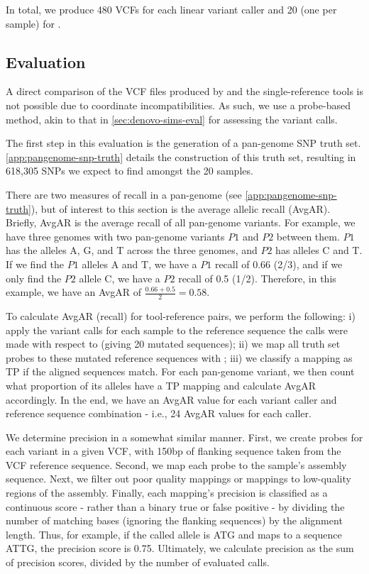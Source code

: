 \noindent
In total, we produce 480 VCFs for each linear variant caller and 20 (one per sample) for \pandora{}.

\subsection{Evaluation}
\label{sec:denovo-empirical-eval}

A direct comparison of the VCF files produced by \pandora{} and the single-reference tools is not possible due to coordinate incompatibilities. As such, we use a probe-based method, akin to that in \autoref{sec:denovo-sims-eval} for assessing the variant calls. 

The first step in this evaluation is the generation of a pan-genome SNP truth set. \autoref{app:pangenome-snp-truth} details the construction of this truth set, resulting in 618,305 SNPs we expect to find amongst the 20 samples.

There are two measures of recall in a pan-genome (see \autoref{app:pangenome-snp-truth}), but of interest to this section is the average allelic recall (AvgAR). Briefly, AvgAR is the average recall of all pan-genome variants. For example, we have three genomes with two pan-genome variants $P1$ and $P2$ between them. $P1$ has the alleles A, G, and T across the three genomes, and $P2$ has alleles C and T. If we find the $P1$ alleles A and T, we have a $P1$ recall of 0.66 (2/3), and if we only find the $P2$ allele C, we have a $P2$ recall of 0.5 (1/2). Therefore, in this example, we have an AvgAR of $\frac{0.66+0.5}{2}=0.58$.

To calculate AvgAR (recall) for tool-reference pairs, we perform the following: i) apply the variant calls for each sample to the reference sequence the calls were made with respect to (giving 20 mutated sequences); ii) we map all truth set probes to these mutated reference sequences with ; iii) we classify a mapping as TP if the aligned sequences match. For each pan-genome variant, we then count what proportion of its alleles have a TP mapping and calculate AvgAR accordingly. In the end, we have an AvgAR value for each variant caller and reference sequence combination - i.e., 24 AvgAR values for each caller.

We determine precision in a somewhat similar manner. First, we create probes for each variant in a given VCF, with 150bp of flanking sequence taken from the VCF reference sequence. Second, we map each probe to the sample's assembly sequence. Next, we filter out poor quality mappings or mappings to low-quality regions of the assembly. Finally, each mapping's precision is classified as a continuous score - rather than a binary true or false positive - by dividing the number of matching bases (ignoring the flanking sequences) by the alignment length. Thus, for example, if the called allele is ATG and maps to a sequence ATTG, the precision score is 0.75. Ultimately, we calculate precision as the sum of precision scores, divided by the number of evaluated calls.

